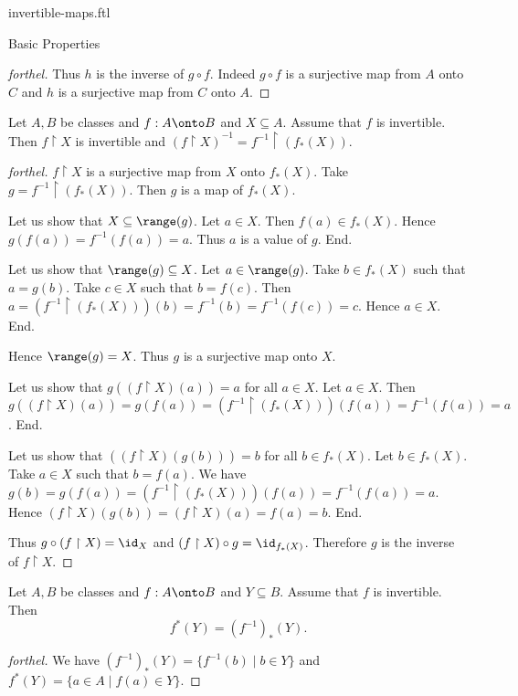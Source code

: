 \documentclass{naproche-library}
\begin{document}
\begin{smodule}[title=Invertible Maps]{invertible-maps.ftl}
\begin{sfragment}{Basic Properties}
\begin{proof}[forthel]
    Thus $h$ is the inverse of $g \circ f$.
    Indeed $g \circ f$ is a surjective map from $A$ onto $C$ and $h$ is a surjective map from $C$ onto $A$.
  \end{proof}

  \begin{proposition}[forthel,id=FOUNDATIONS_09_6374884963778560]
    Let $A, B$ be classes and $f : A \onto B$ and $X \subseteq A$.
    Assume that $f$ is invertible.
    Then $f \restriction X$ is invertible and $(f\restriction X)^{-1} = f^{-1} \restriction (f_{*}(X))$.
  \end{proposition}
  \begin{proof}[forthel]
    $f \restriction X$ is a surjective map from $X$ onto $f_{*}(X)$.
    Take $g = f^{-1} \restriction (f_{*}(X))$.
    Then $g$ is a map of $f_{*}(X)$.

    Let us show that $X \subseteq \range(g)$.
      Let $a \in X$.
      Then $f(a) \in f_{*}(X)$.
      Hence $g(f(a)) = f^{-1}(f(a)) = a$.
      Thus $a$ is a value of $g$.
    End.

    Let us show that $\range(g) \subseteq X$.
      Let $a \in \range(g)$.
      Take $b \in f_{*}(X)$ such that $a = g(b)$.
      Take $c \in X$ such that $b = f(c)$.
      Then $a
        = (f^{-1} \restriction (f_{*}(X)))(b)
        = f^{-1}(b)
        = f^{-1}(f(c))
        = c$.
      Hence $a \in X$.
    End.

    Hence $\range(g) = X$.
    Thus $g$ is a surjective map onto $X$.

    Let us show that $g((f \restriction X)(a)) = a$ for all $a \in X$.
      Let $a \in X$.
      Then $g((f \restriction X)(a))
        = g(f(a))
        = (f^{-1} \restriction (f_{*}(X)))(f(a))
        = f^{-1}(f(a))
        = a$.
    End.

    Let us show that $((f \restriction X)(g(b))) = b$ for all $b \in f_{*}(X)$.
      Let $b \in f_{*}(X)$.
      Take $a \in X$ such that $b = f(a)$.
      We have $g(b)
        = g(f(a))
        = (f^{-1} \restriction (f_{*}(X)))(f(a))
        = f^{-1}(f(a))
        = a$.
      Hence $(f \restriction X)(g(b))
        = (f \restriction X)(a)
        = f(a)
        = b$.
    End.

    Thus $g \circ (f \restriction X) = \id_{X}$ and $(f \restriction X) \circ g = \id_{f_{*}(X)}$.
    Therefore $g$ is the inverse of $f \restriction X$.
  \end{proof}

  \begin{proposition}[forthel,id=FOUNDATIONS_09_7726021377785856]
    Let $A, B$ be classes and $f : A \onto B$ and $Y \subseteq B$.
    Assume that $f$ is invertible.
    Then \[ f^{*}(Y) = (f^{-1})_{*}(Y). \]
  \end{proposition}
  \begin{proof}[forthel]
    We have $(f^{-1})_{*}(Y) = \{ f^{-1}(b) \mid b \in Y \}$ and $f^{*}(Y) = \{ a \in A \mid f(a) \in Y \}$.


\end{proof}
\end{sfragment}
\end{smodule}
\end{document}
